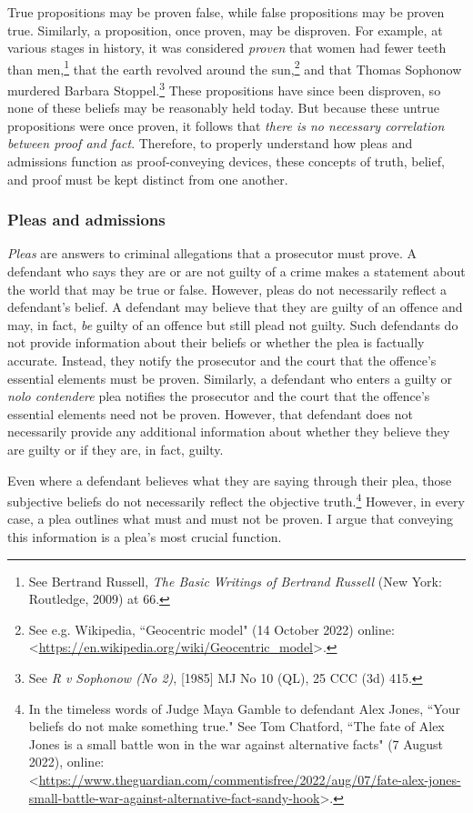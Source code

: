 True propositions may be proven false, while false propositions may be proven true. Similarly, a proposition, once proven, may be disproven. For example, at various stages in history, it was considered \textit{proven} that women had fewer teeth than men,\footnote{See Bertrand Russell, \textit{The Basic Writings of Bertrand Russell} (New York: Routledge, 2009) at 66.} that the earth revolved around the sun,\footnote{See e.g. Wikipedia, ``Geocentric model" (14 October 2022) online: \textless \url{https://en.wikipedia.org/wiki/Geocentric_model}\textgreater.} and that Thomas Sophonow murdered Barbara Stoppel.\footnote{See \textit{R v Sophonow (No 2)}, [1985] MJ No 10 (QL), 25 CCC (3d) 415.} These propositions have since been disproven, so none of these beliefs may be reasonably held today. But because these untrue propositions were once proven, it follows that \textit{there is no necessary correlation between proof and fact}. Therefore, to properly understand how pleas and admissions function as proof-conveying devices, these concepts of truth, belief, and proof must be kept distinct from one another.

\subsubsection{Pleas and admissions}

\textit{Pleas} are answers to criminal allegations that a prosecutor must prove. A defendant who says they are or are not guilty of a crime makes a statement about the world that may be true or false. However, pleas do not necessarily reflect a defendant's belief. A defendant may believe that they are guilty of an offence and may, in fact, \textit{be} guilty of an offence but still plead not guilty. Such defendants do not provide information about their beliefs or whether the plea is factually accurate. Instead, they notify the prosecutor and the court that the offence's essential elements must be proven. Similarly, a defendant who enters a guilty or \textit{nolo contendere} plea notifies the prosecutor and the court that the offence's essential elements need not be proven. However, that defendant does not necessarily provide any additional information about whether they believe they are guilty or if they are, in fact, guilty. 

Even where a defendant believes what they are saying through their plea, those subjective beliefs do not necessarily reflect the objective truth.\footnote{In the timeless words of Judge Maya Gamble to defendant Alex Jones, ``Your beliefs do not make something true." See Tom Chatford, ``The fate of Alex Jones is a small battle won in the war against alternative facts" (7 August 2022), online: \textless \url{https://www.theguardian.com/commentisfree/2022/aug/07/fate-alex-jones-small-battle-war-against-alternative-fact-sandy-hook}\textgreater.} However, in every case, a plea outlines what must and must not be proven. I argue that conveying this information is a plea's most crucial function.

